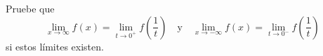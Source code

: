 \item Pruebe que
    $$\lim_{x \to \infty} f(x) = \lim_{t \to 0^+} f\left(\frac{1}{t}\right) \quad \text{y} \quad \lim_{x \to -\infty} f(x) = \lim_{t \to 0^-} f\left(\frac{1}{t}\right)$$
    si estos límites existen.
